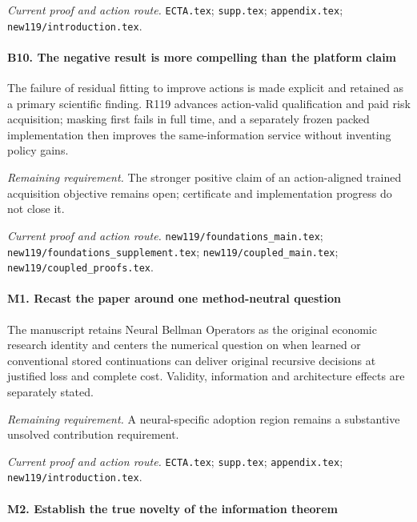 \par\emph{Current proof and action route.} \nolinkurl{ECTA.tex}; \nolinkurl{supp.tex}; \nolinkurl{appendix.tex}; \nolinkurl{new119/introduction.tex}.

\paragraph{B10. The negative result is more compelling than the platform claim}

The failure of residual fitting to improve actions is made explicit and retained as a primary scientific finding. R119 advances action-valid qualification and paid risk acquisition; masking first fails in full time, and a separately frozen packed implementation then improves the same-information service without inventing policy gains.

\par\emph{Remaining requirement.} The stronger positive claim of an action-aligned trained acquisition objective remains open; certificate and implementation progress do not close it.

\par\emph{Current proof and action route.} \nolinkurl{new119/foundations_main.tex}; \nolinkurl{new119/foundations_supplement.tex}; \nolinkurl{new119/coupled_main.tex}; \nolinkurl{new119/coupled_proofs.tex}.

\paragraph{M1. Recast the paper around one method-neutral question}

The manuscript retains Neural Bellman Operators as the original economic research identity and centers the numerical question on when learned or conventional stored continuations can deliver original recursive decisions at justified loss and complete cost. Validity, information and architecture effects are separately stated.

\par\emph{Remaining requirement.} A neural-specific adoption region remains a substantive unsolved contribution requirement.

\par\emph{Current proof and action route.} \nolinkurl{ECTA.tex}; \nolinkurl{supp.tex}; \nolinkurl{appendix.tex}; \nolinkurl{new119/introduction.tex}.

\paragraph{M2. Establish the true novelty of the information theorem}

